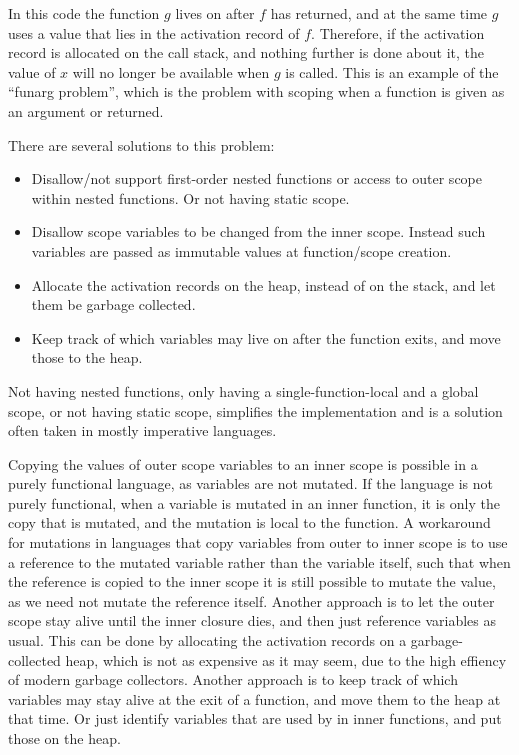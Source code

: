 \documentclass[11pt]{report}
\begin{document}
In this code the function $g$ lives on after $f$ has returned, and at the same time $g$ uses a value that lies in the activation record of $f$. Therefore, if the activation record is allocated on the call stack, and nothing further is done about it, the value of $x$ will no longer be available when $g$ is called.
This is an example of the ``funarg problem'', which is the problem with scoping when a function is given as an argument or returned.
\label{funarg}

There are several solutions to this problem:
\begin{itemize}
\item Disallow/not support first-order nested functions or access to outer scope within nested functions. Or not having static scope.
\item Disallow scope variables to be changed from the inner scope. Instead such variables are passed as immutable values at function/scope creation. 
\item Allocate the activation records on the heap, instead of on the stack, and let them be garbage collected. 
\item Keep track of which variables may live on after the function exits, and move those to the heap.
\end{itemize}

Not having nested functions, only having a single-function-local and a global scope, or not having static scope, simplifies the implementation and is a solution often taken in mostly imperative languages.

Copying the values of outer scope variables to an inner scope is possible in a purely functional language, as variables are not mutated. If the language is not purely functional, when a variable is mutated in an inner function, it is only the copy that is mutated, and the mutation is local to the function.
A workaround for mutations in languages that copy variables from outer to inner scope is to use a reference to the mutated variable rather than the variable itself, such that when the reference is copied to the inner scope it is still possible to mutate the value, as we need not mutate the reference itself.
Another approach is to let the outer scope stay alive until the inner closure dies, and then just reference variables as usual.
This can be done by allocating the activation records on a garbage-collected heap,
which is not as expensive as it may seem, due to the high effiency of modern garbage collectors.
Another approach is to keep track of which variables may stay alive at the exit of a function, and move them to the heap at that time.
Or just identify variables that are used by in inner functions, and put those on the heap.
\end{document}
